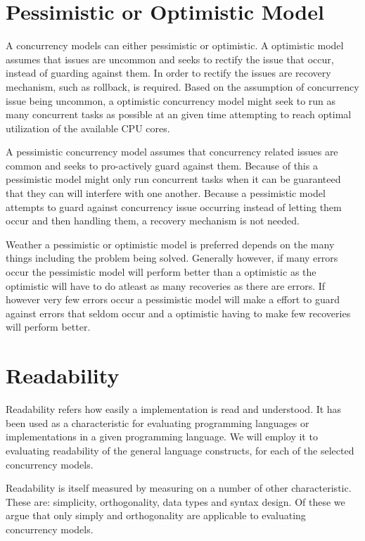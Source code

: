 \section{Pessimistic or Optimistic Model}
A concurrency models can either pessimistic or optimistic. A optimistic model assumes that issues are uncommon and seeks to rectify the issue that occur, instead of guarding against them. In order to rectify the issues are recovery mechanism, such as rollback, is required. Based on the assumption of concurrency issue being uncommon, a optimistic concurrency model might seek to run as many concurrent tasks as possible at an given time attempting to reach optimal utilization of the available \ac{CPU} cores. 

A pessimistic concurrency model assumes that concurrency related issues are common and seeks to pro-actively guard against them. Because of this a pessimistic model might only run concurrent tasks when it can be guaranteed that they can will interfere with one another. Because a pessimistic model attempts to guard against concurrency issue occurring instead of letting them occur and then handling them, a recovery mechanism is not needed.

Weather a pessimistic or optimistic model is preferred depends on the many things including the problem being solved. Generally however, if many errors occur the pessimistic model will perform better than a optimistic as the optimistic will have to do atleast as many recoveries as there are errors. If however very few errors occur a pessimistic model will make a effort to guard against errors that seldom occur and a optimistic having to make few recoveries will perform better.

\section{Readability}\label{sec:readability}
Readability refers how easily a implementation is read and understood\cite[p. 8]{sebestaProLang}. It has been used as a characteristic for evaluating programming languages or implementations in a given programming language. We will employ it to evaluating readability of the general language constructs, for each of the selected concurrency models.

Readability is itself measured by measuring on a number of other characteristic. These are: simplicity, orthogonality, data types and syntax design. Of these we argue that only simply and orthogonality are applicable to evaluating concurrency models.

